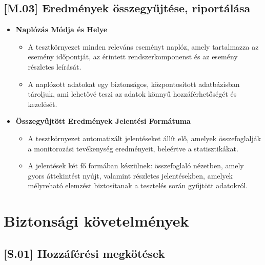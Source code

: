 \documentclass{scrreprt}
\begin{document}
\subsection{[M.03] Eredmények összegyűjtése, riportálása} \label{M.03}

\begin{itemize}
      \item \textbf{Naplózás Módja és Helye}
            \begin{itemize}
                  \item  A tesztkörnyezet minden releváns eseményt naplóz, amely tartalmazza az esemény időpontját, az érintett rendszerkomponenst és az esemény részletes leírását.
            \end{itemize}
            \begin{itemize}
                  \item  A naplózott adatokat egy biztonságos, központosított adatbázisban tároljuk, ami lehetővé teszi az adatok könnyű hozzáférhetőségét és kezelését.
            \end{itemize}
\end{itemize}

\begin{itemize}
      \item \textbf{Összegyűjtött Eredmények Jelentési Formátuma}
            \begin{itemize}
                  \item  A tesztkörnyezet automatizált jelentéseket állít elő, amelyek összefoglalják a monitorozási tevékenység eredményeit, beleértve a statisztikákat.
            \end{itemize}
            \begin{itemize}
                  \item A jelentések két fő formában készülnek: összefoglaló nézetben, amely gyors áttekintést nyújt, valamint részletes jelentésekben, amelyek mélyreható elemzést
                        biztosítanak a tesztelés során gyűjtött adatokról.
            \end{itemize}
\end{itemize}

\section{Biztonsági követelmények}

\subsection{[S.01] Hozzáférési megkötések} \label{S.01}
\end{document}
